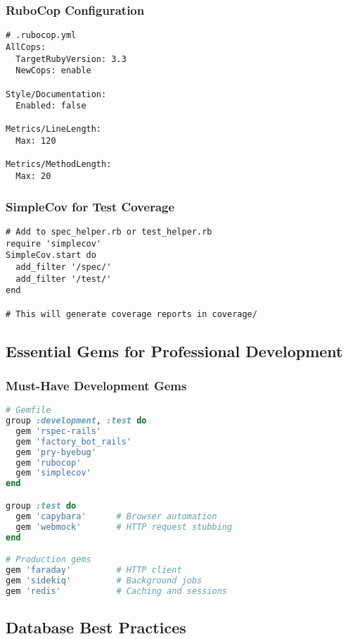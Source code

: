 \documentclass[12pt,a4paper]{article}
\begin{document}
\subsubsection{RuboCop Configuration}

\begin{lstlisting}
# .rubocop.yml
AllCops:
  TargetRubyVersion: 3.3
  NewCops: enable

Style/Documentation:
  Enabled: false

Metrics/LineLength:
  Max: 120

Metrics/MethodLength:
  Max: 20
\end{lstlisting}

\subsubsection{SimpleCov for Test Coverage}

\begin{lstlisting}
# Add to spec_helper.rb or test_helper.rb
require 'simplecov'
SimpleCov.start do
  add_filter '/spec/'
  add_filter '/test/'
end

# This will generate coverage reports in coverage/
\end{lstlisting}

\subsection{Essential Gems for Professional Development}

\subsubsection{Must-Have Development Gems}

\begin{lstlisting}[language=ruby]
# Gemfile
group :development, :test do
  gem 'rspec-rails'
  gem 'factory_bot_rails'
  gem 'pry-byebug'
  gem 'rubocop'
  gem 'simplecov'
end

group :test do
  gem 'capybara'      # Browser automation
  gem 'webmock'       # HTTP request stubbing
end

# Production gems
gem 'faraday'         # HTTP client
gem 'sidekiq'         # Background jobs
gem 'redis'           # Caching and sessions
\end{lstlisting}

\subsection{Database Best Practices}
\end{document}
